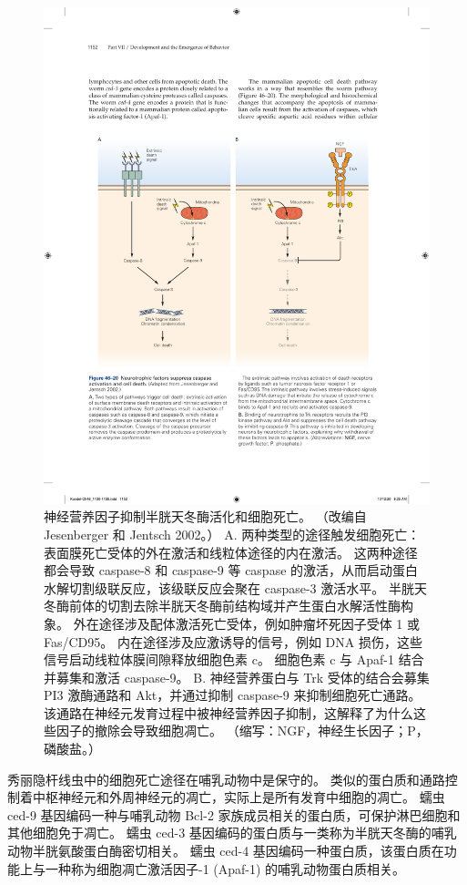 \begin{figure}[htbp]
	\centering
	\includegraphics[width=0.9\linewidth]{chap46/fig_46_20}
	\caption{神经营养因子抑制半胱天冬酶活化和细胞死亡。 （改编自 Jesenberger 和 Jentsch 2002。） A. 两种类型的途径触发细胞死亡：表面膜死亡受体的外在激活和线粒体途径的内在激活。 这两种途径都会导致 caspase-8 和 caspase-9 等 caspase 的激活，从而启动蛋白水解切割级联反应，该级联反应会聚在 caspase-3 激活水平。 半胱天冬酶前体的切割去除半胱天冬酶前结构域并产生蛋白水解活性酶构象。 外在途径涉及配体激活死亡受体，例如肿瘤坏死因子受体 1 或 Fas/CD95。 内在途径涉及应激诱导的信号，例如 DNA 损伤，这些信号启动线粒体膜间隙释放细胞色素 c。 细胞色素 c 与 Apaf-1 结合并募集和激活 caspase-9。 B. 神经营养蛋白与 Trk 受体的结合会募集 PI3 激酶通路和 Akt，并通过抑制 caspase-9 来抑制细胞死亡通路。 该通路在神经元发育过程中被神经营养因子抑制，这解释了为什么这些因子的撤除会导致细胞凋亡。 （缩写：NGF，神经生长因子；P，磷酸盐。）}
	\label{fig:46_20}
\end{figure}

秀丽隐杆线虫中的细胞死亡途径在哺乳动物中是保守的。 类似的蛋白质和通路控制着中枢神经元和外周神经元的凋亡，实际上是所有发育中细胞的凋亡。 蠕虫 ced-9 基因编码一种与哺乳动物 Bcl-2 家族成员相关的蛋白质，可保护淋巴细胞和其他细胞免于凋亡。 蠕虫 ced-3 基因编码的蛋白质与一类称为半胱天冬酶的哺乳动物半胱氨酸蛋白酶密切相关。 蠕虫 ced-4 基因编码一种蛋白质，该蛋白质在功能上与一种称为细胞凋亡激活因子-1 (Apaf-1) 的哺乳动物蛋白质相关。

